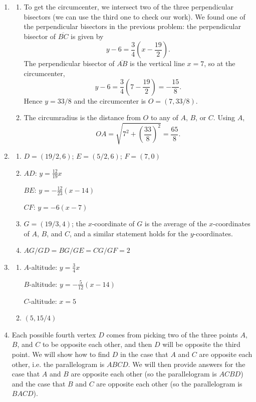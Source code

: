 \begin{enumerate}
\begin{enumerate}
\end{enumerate}
\item \begin{enumerate}
\item To get the circumcenter, we intersect two of the three perpendicular bisectors (we can use the third one to check our work). We found one of the perpendicular bisectors in the previous problem: the perpendicular bisector of $\overline{BC}$ is given by 
\begin{equation*}
y - 6 = \frac{3}{4}\left(x - \frac{19}{2}\right).
\end{equation*}
The perpendicular bisector of $\overline{AB}$ is the vertical line $x = 7$, so at the circumcenter, 
\begin{equation*}
y - 6 = \frac{3}{4}\left(7 - \frac{19}{2}\right) = -\frac{15}{8}.
\end{equation*}
Hence $y = 33/8$ and the circumcenter is $O = \boxed{(7, 33/8)}$.
\item The circumradius is the distance from $O$ to any of $A$, $B$, or $C$. Using $A$,
\begin{equation*}
OA = \sqrt{7^2 + \left(\frac{33}{8}\right)^2} = \boxed{\frac{65}{8}}.
\end{equation*}
\end{enumerate}
\item \begin{enumerate}
\item $D = (19/2, 6)$; $E = (5/2, 6)$; $F = (7,0)$
\item $AD$: $y = \frac{12}{19}x$\par
$BE$: $y = -\frac{12}{23}(x - 14)$\par 
$CF$: $y = -6(x - 7)$
\item $G = (19/3, 4)$; the $x$-coordinate of $G$ is the average of the $x$-coordinates of $A$, $B$, and $C$, and a similar statement holds for the $y$-coordinates.
\item $AG/GD = BG/GE = CG/GF = 2$
\end{enumerate}
\item \begin{enumerate}
\item $A$-altitude: $y = \frac{3}{4}x$\par 
$B$-altitude: $y = -\frac{5}{12}(x - 14)$\par 
$C$-altitude: $x = 5$
\item $(5, 15/4)$
\end{enumerate}
\item Each possible fourth vertex $D$ comes from picking two of the three points $A$, $B$, and $C$ to be opposite each other, and then $D$ will be opposite the third point. We will show how to find $D$ in the case that $A$ and $C$ are opposite each other, i.e. the parallelogram is $ABCD$. We will then provide answers for the case that $A$ and $B$ are opposite each other (so the parallelogram is $ACBD$) and the case that $B$ and $C$ are opposite each other (so the parallelogram is $BACD$).\par 

\end{enumerate}
